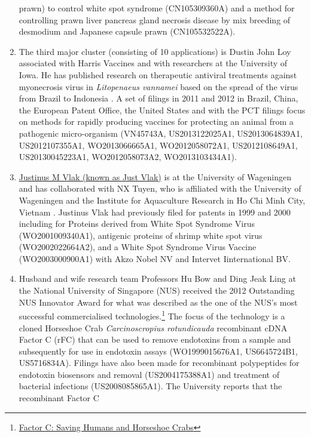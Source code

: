\documentclass[]{book}
\theoremstyle{definition}
\theoremstyle{definition}
\theoremstyle{definition}
\theoremstyle{remark}
\begin{document}
\begin{enumerate}
  prawn) to control white spot syndrome (CN105309360A) and a method for
  controlling prawn liver pancreas gland necrosis disease by mix
  breeding of desmodium and Japanese capsule prawn (CN105532522A).
\item
  The third major cluster (consisting of 10 applications) is Dustin John
  Loy associated with Harris Vaccines and with researchers at the
  University of Iowa. He has published research on therapeutic antiviral
  treatments against myonecrosis virus in \emph{Litopenaeus vannamei}
  based on the spread of the virus from Brazil to Indonesia
  \citep{Loy_2012, Loy_2013}. A set of filings in 2011 and 2012 in
  Brazil, China, the European Patent Office, the United States and with
  the PCT filings focus on methods for rapidly producing vaccines for
  protecting an animal from a pathogenic micro-organism (VN45743A,
  US2013122025A1, US2013064839A1, US2012107355A1, WO2013066665A1,
  WO2012058072A1, US2012108649A1, US20130045223A1, WO2012058073A2,
  WO2013103434A1).
\item
  \href{https://www.wur.nl/en/Persons/prof.dr.-JM-Just-Vlak.htm}{Justinus
  M Vlak (known as Just Vlak)} is at the University of Wageningen and
  has collaborated with NX Tuyen, who is affiliated with the University
  of Wageningen and the Institute for Aquaculture Research in Ho Chi
  Minh City, Vietnam \citep[see][]{Tuyen_2014}. Justinus Vlak had
  previously filed for patents in 1999 and 2000 including for Proteins
  derived from White Spot Syndrome Virus (WO2001009340A1), antigenic
  proteins of shrimp white spot virus (WO2002022664A2), and a White Spot
  Syndrome Virus Vaccine (WO2003000900A1) with Akzo Nobel NV and
  Intervet Iinternational BV.
\item
  Husband and wife research team Professors Hu Bow and Ding Jeak Ling at
  the National University of Singapore (NUS) received the 2012
  Outstanding NUS Innovator Award for what was described as the one of
  the NUS's most successful commercialised technologies.\footnote{\href{http://enterprise.nus.edu.sg/success-stories/detail/12}{Factor
    C: Saving Humans and Horseshoe Crabs}} The focus of the technology
  is a cloned Horseshoe Crab \emph{Carcinoscropius rotundicauda}
  recombinant cDNA Factor C (rFC) that can be used to remove endotoxins
  from a sample and subsequently for use in endotoxin assays
  (WO1999015676A1, US6645724B1, US5716834A). Filings have also been made
  for recombinant polypeptides for endotoxin biosensors and removal
  (US2004175388A1) and treatment of bacterial infections
  (US2008085865A1). The University reports that the recombinant Factor C

\end{enumerate}
\end{document}
